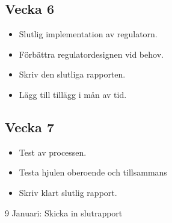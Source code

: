 \documentclass[a4paper]{article}
\begin{document}
    \subsection*{Vecka 6}
    \begin{itemize}
	\item Slutlig implementation av regulatorn.
    \item Förbättra regulatordesignen vid behov.
    \item Skriv den slutliga rapporten.
    \item Lägg till tillägg i mån av tid.
	\end{itemize}
    
    \subsection*{Vecka 7}
    \begin{itemize}
	\item Test av processen.
    \item Testa hjulen oberoende och tillsammans
    \item Skriv klart slutlig rapport.
	\end{itemize}

9 Januari: Skicka in slutrapport
\end{document}
